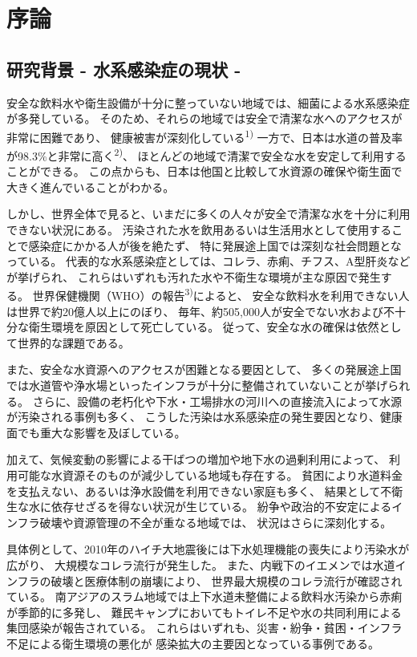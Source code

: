 \chapter{序論}

\section{研究背景 - 水系感染症の現状 -}

安全な飲料水や衛生設備が十分に整っていない地域では、細菌による水系感染症が多発している。
そのため、それらの地域では安全で清潔な水へのアクセスが非常に困難であり、
健康被害が深刻化している\textsuperscript{1)}
一方で、日本は水道の普及率が98.3\%と非常に高く\textsuperscript{2)}、
ほとんどの地域で清潔で安全な水を安定して利用することができる。
この点からも、日本は他国と比較して水資源の確保や衛生面で大きく進んでいることがわかる。

しかし、世界全体で見ると、いまだに多くの人々が安全で清潔な水を十分に利用できない状況にある。
汚染された水を飲用あるいは生活用水として使用することで感染症にかかる人が後を絶たず、
特に発展途上国では深刻な社会問題となっている。
代表的な水系感染症としては、コレラ、赤痢、チフス、A型肝炎などが挙げられ、
これらはいずれも汚れた水や不衛生な環境が主な原因で発生する。
世界保健機関（WHO）の報告\textsuperscript{3)}によると、
安全な飲料水を利用できない人は世界で約20億人以上にのぼり、
毎年、約505,000人が安全でない水および不十分な衛生環境を原因として死亡している。
従って、安全な水の確保は依然として世界的な課題である。

また、安全な水資源へのアクセスが困難となる要因として、
多くの発展途上国では水道管や浄水場といったインフラが十分に整備されていないことが挙げられる。
さらに、設備の老朽化や下水・工場排水の河川への直接流入によって水源が汚染される事例も多く、
こうした汚染は水系感染症の発生要因となり、健康面でも重大な影響を及ぼしている。

加えて、気候変動の影響による干ばつの増加や地下水の過剰利用によって、
利用可能な水資源そのものが減少している地域も存在する。
貧困により水道料金を支払えない、あるいは浄水設備を利用できない家庭も多く、
結果として不衛生な水に依存せざるを得ない状況が生じている。
紛争や政治的不安定によるインフラ破壊や資源管理の不全が重なる地域では、
状況はさらに深刻化する。

具体例として、2010年のハイチ大地震後には下水処理機能の喪失により汚染水が広がり、
大規模なコレラ流行が発生した。
また、内戦下のイエメンでは水道インフラの破壊と医療体制の崩壊により、
世界最大規模のコレラ流行が確認されている。
南アジアのスラム地域では上下水道未整備による飲料水汚染から赤痢が季節的に多発し、
難民キャンプにおいてもトイレ不足や水の共同利用による集団感染が報告されている。
これらはいずれも、災害・紛争・貧困・インフラ不足による衛生環境の悪化が
感染拡大の主要因となっている事例である。

